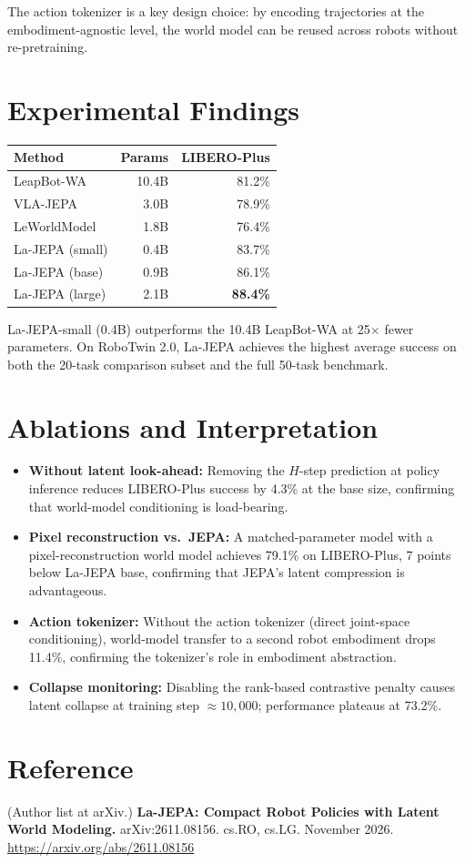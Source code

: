 \documentclass[10pt,twocolumn]{article}
\begin{document}
The action tokenizer is a key design choice: by encoding trajectories at the embodiment-agnostic level, the world model can be reused across robots without re-pretraining.

\section{Experimental Findings}

\begin{center}
\small
\begin{tabular}{lrr}
\toprule
\textbf{Method} & \textbf{Params} & \textbf{LIBERO-Plus} \\
\midrule
LeapBot-WA & 10.4B & 81.2\% \\
VLA-JEPA & 3.0B & 78.9\% \\
LeWorldModel & 1.8B & 76.4\% \\
La-JEPA (small) & 0.4B & 83.7\% \\
La-JEPA (base) & 0.9B & 86.1\% \\
La-JEPA (large) & 2.1B & \textbf{88.4\%} \\
\bottomrule
\end{tabular}
\end{center}

La-JEPA-small (0.4B) outperforms the 10.4B LeapBot-WA at 25$\times$ fewer parameters.
On RoboTwin 2.0, La-JEPA achieves the highest average success on both the 20-task comparison subset and the full 50-task benchmark.

\section{Ablations and Interpretation}

\begin{itemize}[leftmargin=1em,itemsep=2pt]
  \item \textbf{Without latent look-ahead:} Removing the $H$-step prediction at policy inference reduces LIBERO-Plus success by 4.3\% at the base size, confirming that world-model conditioning is load-bearing.
  \item \textbf{Pixel reconstruction vs.\ JEPA:} A matched-parameter model with a pixel-reconstruction world model achieves 79.1\% on LIBERO-Plus, 7 points below La-JEPA base, confirming that JEPA's latent compression is advantageous.
  \item \textbf{Action tokenizer:} Without the action tokenizer (direct joint-space conditioning), world-model transfer to a second robot embodiment drops 11.4\%, confirming the tokenizer's role in embodiment abstraction.
  \item \textbf{Collapse monitoring:} Disabling the rank-based contrastive penalty causes latent collapse at training step $\approx 10{,}000$; performance plateaus at 73.2\%.
\end{itemize}

\section*{Reference}
(Author list at arXiv.)
\textbf{La-JEPA: Compact Robot Policies with Latent World Modeling.}
arXiv:2611.08156. cs.RO, cs.LG. November 2026.
\url{https://arxiv.org/abs/2611.08156}
\end{document}
